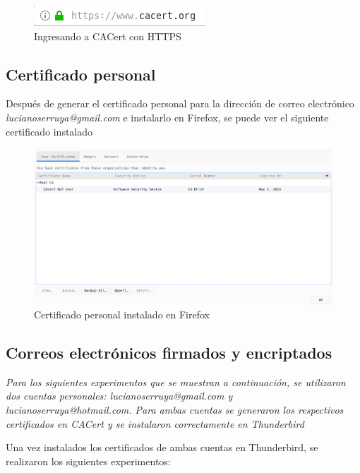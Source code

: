 \begin{figure}[h]
    \centering
    \includegraphics{images/arys-tp3-cacert-con-https.png}
    \caption*{Ingresando a CACert con HTTPS}
\end{figure}

\subsection{Certificado personal}

Después de generar el certificado personal para la dirección de correo electrónico \emph{lucianoserruya@gmail.com} e instalarlo en Firefox, se puede ver el siguiente certificado instalado 

\begin{figure}[H]
    \centering
    \includegraphics[width=\linewidth]{images/arys-tp3-cacert-certificado-gmail.png}
    \caption*{Certificado personal instalado en Firefox}
\end{figure}

\subsection{Correos electrónicos firmados y encriptados}

\emph{Para los siguientes experimentos que se muestran a continuación, se utilizaron dos cuentas personales: \emph{lucianoserruya@gmail.com} y \emph{lucianoserruya@hotmail.com}. Para ambas cuentas se generaron los respectivos certificados en CACert y se instalaron correctamente en Thunderbird} 

\vspace*{5mm}

Una vez instalados los certificados de ambas cuentas en Thunderbird, se realizaron los siguientes experimentos:

